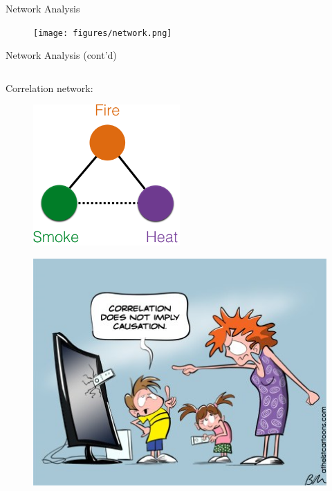 \documentclass{beamer}
\begin{document}
\begin{frame}{Network Analysis}
	\begin{figure}[ht]
		\centering
		\texttt{[image: figures/network.png]}
		\caption*{\label{fig:network}}
	\end{figure}
\end{frame}
\begin{frame}{Network Analysis (cont'd)}
	\begin{columns}
		\begin{column}[t]{.48\textwidth}
			Correlation network:
			\begin{figure}[ht]
				\centering
				\includegraphics[width=0.5\textwidth]{figures/correlation.png}
				\caption*{\label{fig:correlation-network}}
			\end{figure}
			\vspace{-1.5cm}
			\begin{figure}[ht]
				\centering
				\includegraphics[width=1\textwidth,height=0.4\textheight]{figures/correlation-causation.png}

\end{figure}
\end{column}
\end{columns}
\end{frame}
\end{document}
